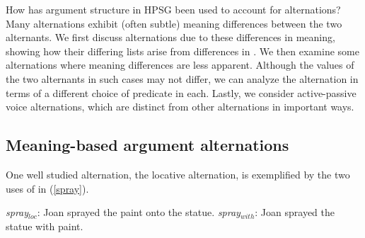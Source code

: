 \documentclass[output=paper
                ,modfonts
                ,nonflat
	        ,collection
	        ,collectionchapter
	        ,collectiontoclongg
 	        ,biblatex
                ,babelshorthands
                ,newtxmath
                ,draftmode
                ,colorlinks, citecolor=brown
]{./langsci/langscibook}
\begin{document}
How has argument structure in HPSG been used to account for alternations?
Many alternations exhibit (often subtle) meaning differences between the two 
alternants.
We first discuss alternations due to these differences in meaning, showing how their differing \argst lists arise from differences in .  
We then examine some alternations where meaning differences are less apparent.
Although the  values of the two alternants in such cases may not differ, we can analyze the alternation in terms of a different choice of  predicate in each.
Lastly, we consider active-passive voice alternations, which are distinct from other alternations in important ways.

\subsection{Meaning-based argument alternations}

One well studied alternation, the locative alternation, is exemplified by the two uses of  in (\ref{spray}).

\begin{exe}
\ex \label{spray}
\begin{xlist}
\ex \label{spraya} \textit{spray$_{loc}$}: Joan sprayed the paint onto the statue.
\ex \label{sprayb} \textit{spray$_{with}$}: Joan sprayed the statue with paint.
 \end{xlist}
 \end{exe}
\end{document}
